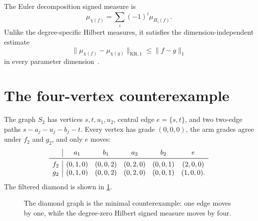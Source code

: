\documentclass[11pt]{article}
\theoremstyle{definition}
\newcommand{\1}{\mathbf{1}}
\newcommand{\KR}{\mathrm{KR}}
\begin{document}
The Euler decomposition signed measure
\cite[Definition~5]{LoiseauxEtAl2023} is
\[
  \mu_{\chi(f)}=\sum_i(-1)^i\mu_{H_i(f)}.
\]
Unlike the degree-specific Hilbert measures, it satisfies the
dimension-independent estimate
\begin{equation}\label{eq:euler-positive}
  \lVert\mu_{\chi(f)}-\mu_{\chi(g)}\rVert_{\KR,1}
  \leq \lVert f-g\rVert_1
\end{equation}
in every parameter dimension~\cite[Theorem~1(2)]{LoiseauxEtAl2023}.

\section{The four-vertex counterexample}\label{sec:diamond}

The graph $S_2$ has vertices $s,t,u_1,u_2$, central edge
$e=\{s,t\}$, and two two-edge paths
$s-a_j-u_j-b_j-t$.  Every vertex has grade $(0,0,0)$, the arm grades agree
under $f_2$ and $g_2$, and only $e$ moves:
\[
\begin{array}{c|ccccc}
 & a_1 & b_1 & a_2 & b_2 & e\\
\midrule
 f_2 & (0,1,0)&(0,0,2)&(0,2,0)&(0,0,1)&(2,0,0)\\
 g_2 & (0,1,0)&(0,0,2)&(0,2,0)&(0,0,1)&(1,0,0).
\end{array}
\]
The filtered diamond is shown in \cref{fig:diamond}.

\begin{figure}[t]
\centering
{}
\caption{The diamond graph is the minimal counterexample: one edge moves by
one, while the degree-zero Hilbert signed measure moves by four.}
\label{fig:diamond}
\end{figure}
\end{document}
